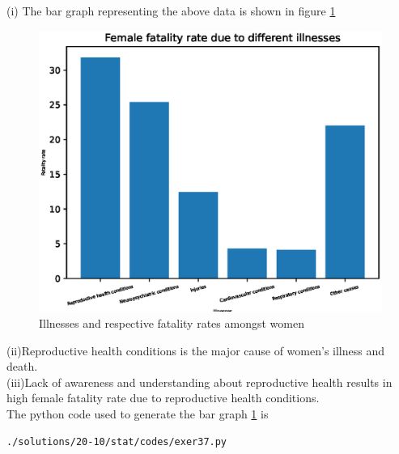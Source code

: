 (i) The bar graph representing the above data is shown in figure \ref{fig:bar37_py}\\
\begin{figure}[!ht]
\centering
\includegraphics[width=\columnwidth]{./solutions/20-10/stat/codes/pyfigs/exer37.eps}
\caption{Illnesses and respective fatality rates amongst women}
\label{fig:bar37_py}
\end{figure}
(ii)Reproductive health conditions is the major cause of women's illness and death.\\
(iii)Lack of awareness and understanding about reproductive health results in high female fatality rate due to reproductive health conditions.\\
The python code used to generate the bar graph \ref{fig:bar37_py} is
\begin{lstlisting}
./solutions/20-10/stat/codes/exer37.py
\end{lstlisting}
